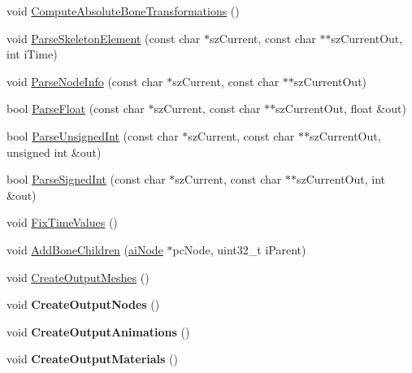 \begin{DoxyCompactItemize}
void \hyperlink{class_assimp_1_1_s_m_d_importer_a4407e13726d7d01c276d7f723a2c6802}{Compute\+Absolute\+Bone\+Transformations} ()
\item 
void \hyperlink{class_assimp_1_1_s_m_d_importer_a7175ec143cbb133e3586de28dcf0e857}{Parse\+Skeleton\+Element} (const char $\ast$sz\+Current, const char $\ast$$\ast$sz\+Current\+Out, int i\+Time)
\item 
void \hyperlink{class_assimp_1_1_s_m_d_importer_a918fc8e35627d7186f21ef000049df07}{Parse\+Node\+Info} (const char $\ast$sz\+Current, const char $\ast$$\ast$sz\+Current\+Out)
\item 
bool \hyperlink{class_assimp_1_1_s_m_d_importer_ac81e8a5654c539bb3386535764eda23b}{Parse\+Float} (const char $\ast$sz\+Current, const char $\ast$$\ast$sz\+Current\+Out, float \&out)
\item 
bool \hyperlink{class_assimp_1_1_s_m_d_importer_acc75e7b3c642464a46628cf3980f5b2e}{Parse\+Unsigned\+Int} (const char $\ast$sz\+Current, const char $\ast$$\ast$sz\+Current\+Out, unsigned int \&out)
\item 
bool \hyperlink{class_assimp_1_1_s_m_d_importer_ac6b997b405ba188488266cb817e39109}{Parse\+Signed\+Int} (const char $\ast$sz\+Current, const char $\ast$$\ast$sz\+Current\+Out, int \&out)
\item 
void \hyperlink{class_assimp_1_1_s_m_d_importer_ad585642fe3732c2841dc561876e67e11}{Fix\+Time\+Values} ()
\item 
void \hyperlink{class_assimp_1_1_s_m_d_importer_a33266255852d0183bbc4df0b94bdcea2}{Add\+Bone\+Children} (\hyperlink{structai_node}{ai\+Node} $\ast$pc\+Node, uint32\+\_\+t i\+Parent)
\item 
void \hyperlink{class_assimp_1_1_s_m_d_importer_a7564a8623a6f980371e71bdbb48ab2f7}{Create\+Output\+Meshes} ()
\item 
\hypertarget{class_assimp_1_1_s_m_d_importer_a4a26a96fcf27562b9c67fe2449b8d285}{void {\bfseries Create\+Output\+Nodes} ()}\label{class_assimp_1_1_s_m_d_importer_a4a26a96fcf27562b9c67fe2449b8d285}

\item 
\hypertarget{class_assimp_1_1_s_m_d_importer_aa8932fc5a827810a68415a2d6c2e738a}{void {\bfseries Create\+Output\+Animations} ()}\label{class_assimp_1_1_s_m_d_importer_aa8932fc5a827810a68415a2d6c2e738a}

\item 
\hypertarget{class_assimp_1_1_s_m_d_importer_a347ef904dee7e1b6e74c98a6aeb3a589}{void {\bfseries Create\+Output\+Materials} ()}\label{class_assimp_1_1_s_m_d_importer_a347ef904dee7e1b6e74c98a6aeb3a589}


\end{DoxyCompactItemize}
